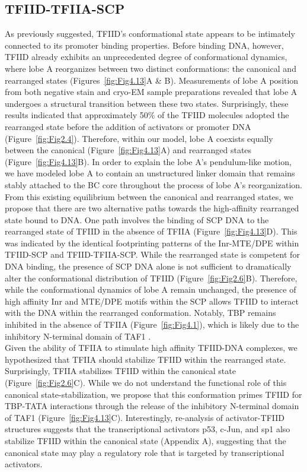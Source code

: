 \subsection{TFIID-TFIIA-SCP}

As previously suggested, TFIID's conformational state appears to be intimately connected to its promoter binding properties. Before binding DNA, however, TFIID already exhibits an unprecedented degree of conformational dynamics, where lobe A reorganizes between two distinct conformations: the canonical and rearranged states (Figures~\ref{fig:Fig4.13}A \& B). Measurements of lobe A position from both negative stain and cryo-EM sample preparations revealed that lobe A undergoes a structural transition between these two states. Surprisingly, these results indicated that approximately 50\% of the TFIID molecules adopted the rearranged state before the addition of activators or promoter DNA  (Figure~\ref{fig:Fig2.4}). Therefore, within our model, lobe A coexists equally between the canonical (Figure~\ref{fig:Fig4.13}A) and rearranged states (Figure~\ref{fig:Fig4.13}B). In order to explain the lobe A's pendulum-like motion, we have modeled lobe A to contain an unstructured linker domain that remains stably attached to the BC core throughout the process of lobe A's reorganization. \\
\indent From this existing equilibrium between the canonical and rearranged states, we propose that there are two alternative paths towards the high-affinity rearranged state bound to DNA. One path involves the binding of SCP DNA to the rearranged state of TFIID in the absence of TFIIA (Figure~\ref{fig:Fig4.13}D). This was indicated by the identical footprinting patterns of the Inr-MTE/DPE within TFIID-SCP and TFIID-TFIIA-SCP. While the rearranged state is competent for DNA binding, the presence of SCP DNA alone is not sufficient to dramatically alter the conformational distribution of TFIID (Figure~\ref{fig:Fig2.6}B). Therefore, while the conformational dynamics of lobe A remain unchanged, the presence of high affinity Inr and MTE/DPE motifs within the SCP allows TFIID to interact with the DNA within the rearranged conformation.  Notably, TBP remains inhibited in the absence of TFIIA (Figure~\ref{fig:Fig4.1}), which is likely due to the inhibitory N-terminal domain of TAF1 \cite{Bagby_2202,Geiger_2949,Liu_2574}. \\
\indent Given the ability of TFIIA to stimulate high affinity TFIID-DNA complexes, we hypothesized that TFIIA should stabilize TFIID within the rearranged state. Surprisingly, TFIIA stabilizes TFIID within the canonical state (Figure~\ref{fig:Fig2.6}C). While we do not understand the functional role of this canonical state-stabilization, we propose that this conformation primes TFIID for TBP-TATA interactions through the release of the inhibitory N-terminal domain of TAF1 (Figure~\ref{fig:Fig4.13}C). Interestingly, re-analysis of activator-TFIID structures suggests that the transcriptional activators p53, c-Jun, and sp1 also stabilize TFIID within the canonical state (Appendix A), suggesting that the canonical state may play a regulatory role that is targeted by transcriptional activators.\\

